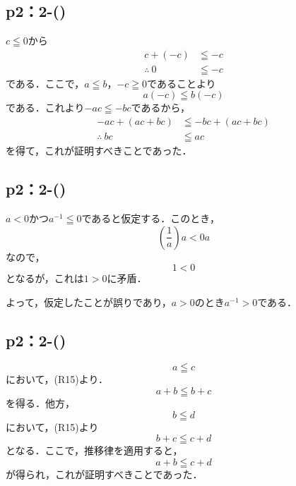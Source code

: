 \subsection*{p2：2-()}
\begin{tproof}
    $c \leqq 0$から
    \begin{align*}
        c+(-c)         & \leqq -c \\
        \therefore ~ 0 & \leqq -c
    \end{align*}
    である．ここで，$a \leqq b$，$-c \geqq 0$であることより
    \[
        a(-c) \leqq b (-c)
    \]
    である．これより$ -ac \leqq -bc$であるから，
    \begin{align*}
        -ac + (ac+bc)   & \leqq -bc +(ac+bc) \\
        \therefore ~ bc & \leqq ac
    \end{align*}
    を得て，これが証明すべきことであった．
\end{tproof}

\subsection*{p2：2-()}
\begin{tproof}
    $a<0$かつ$a^{-1} \leqq 0$であると仮定する．このとき，
    \[
        \left( \frac{1}{a} \right) a < 0a
    \]
    なので，
    \[
        1<0
    \]
    となるが，これは$1>0$に矛盾．

    よって，仮定したことが誤りであり，$a>0$のとき$a^{-1} >0$である．
\end{tproof}

\subsection*{p2：2-()}
\begin{tproof}
    \[
        a \leqq c
    \]
    において，(R15)より．
    \[
        a+b \leqq b+c
    \]
    を得る．他方，
    \[
        b \leqq d
    \]
    において，(R15)より
    \[
        b + c \leqq c+d
    \]
    となる．ここで，推移律を適用すると，
    \[
        a+b \leqq c+d
    \]
    が得られ，これが証明すべきことであった．
\end{tproof}
%
